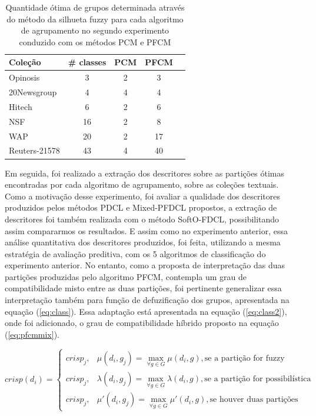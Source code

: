 \begin{table}[!htp]
  \centering
  \begin{tabular}{ |l|c|c|c|c|}
    \hline
    {\bf Coleção} & {\bf \# classes} & {\bf PCM} & {\bf PFCM} \\
    \hline
    Opinosis & 3 & 2 & 3 \\
    \hline
    20Newsgroup & 4 & 4 & 4 \\
    \hline
    Hitech & 6 & 2 & 6 \\
    \hline
    NSF & 16 &  2 & 8 \\
    \hline
    WAP & 20 & 2 & 17 \\
    \hline
    Reuters-21578 & 43 & 4 & 40 \\
    \hline
  \end{tabular}
  \caption{Quantidade ótima de grupos determinada através do método da silhueta fuzzy para cada
  algoritmo de agrupamento no segundo experimento conduzido com os métodos PCM e PFCM}
  \label{table:pfcmclusters}
\end{table}

Em seguida, foi realizado a extração dos descritores sobre as partições ótimas encontradas por
cada algoritmo de agrupamento, sobre as coleções textuais. Como a motivação desse experimento, foi
avaliar a qualidade dos descritores produzidos pelos métodos PDCL e Mixed-PFDCL propostos, a extração
de descritores foi também realizada com o método SoftO-FDCL, possibilitando assim compararmos os
resultados. E assim como no experimento anterior, essa análise quantitativa dos descritores
produzidos, foi feita, utilizando a mesma estratégia de avaliação preditiva,
com os 5 algoritmos de classificação do experimento anterior. No entanto, como a proposta de
interpretação das duas partições produzidas pelo algoritmo PFCM, contempla um grau de
compatibilidade misto entre as duas partições, foi pertinente generalizar essa interpretação
também para função de defuzificação dos grupos, apresentada na equação
(\ref{eq:class}). Essa adaptação está apresentada na equação (\ref{eq:class2}), onde 
foi adicionado, o grau de compatibilidade híbrido proposto na equação (\ref{eq:pfcmmix}).

\begin{equation}
  crisp(d_i) = \begin{cases}
    crisp_j, & \mu(d_i,g_j) = \displaystyle\max_{\forall g \in G} \mu(d_i,g), \text{se a partição
  for fuzzy}\\
  crisp_j, & \lambda(d_i,g_j) = \displaystyle\max_{\forall g \in G} \lambda(d_i,g), \text{se a
  partição for possibilística}\\
  crisp_j, & \mu'(d_i,g_j) = \displaystyle\max_{\forall g \in G} \mu'(d_i,g), \text{se houver
duas partições}
  \end{cases}
  \label{eq:class2}
\end{equation}

